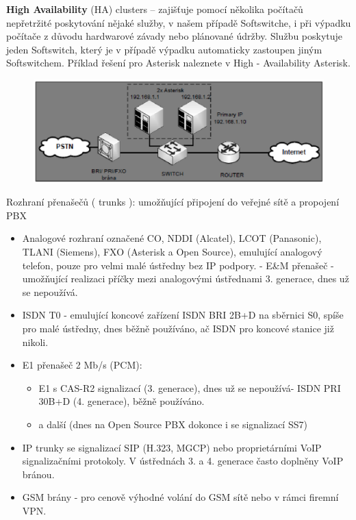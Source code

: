 \textbf{High Availability} (HA) clusters -- zajišťuje pomocí několika počítačů nepřetržité poskytování nějaké služby, v našem případě Softswitche, i při výpadku počítače z důvodu hardwarové závady nebo plánované údržby. Službu poskytuje jeden Softswitch, který je v případě výpadku automaticky zastoupen jiným Softswitchem. Příklad řešení pro Asterisk naleznete v High - Availability Asterisk.

\begin{figure}[h!]
    \begin{center}
        \includegraphics[width=\textwidth]{images/otazka11.png}
        \label{img:5}
    \end{center}
\end{figure}

Rozhraní přenašečů ( trunks ):
umožňující připojení do veřejné sítě a propojení PBX
\begin{itemize}[noitemsep]
    \item Analogové rozhraní označené CO, NDDI (Alcatel), LCOT (Panasonic), TLANI (Siemens), FXO (Asterisk a Open Source), emulující analogový telefon, pouze pro velmi malé ústředny bez IP podpory. - E\&M přenašeč - umožňující realizaci příčky mezi analogovými ústřednami 3. generace, dnes už se nepoužívá.
    \item ISDN T0 - emulující koncové zařízení ISDN BRI 2B+D na sběrnici S0, spíše pro malé ústředny, dnes běžně používáno, ač ISDN pro koncové stanice již nikoli.
    \item E1 přenašeč 2 Mb/s (PCM):
    \begin{itemize}[noitemsep]
        \item E1 s CAS-R2 signalizací (3. generace), dnes už se nepoužívá- ISDN PRI 30B+D (4. generace), běžně používáno.
        \item a další (dnes na Open Source PBX dokonce i se signalizací SS7)
    \end{itemize}
    \item IP trunky se signalizací SIP (H.323, MGCP) nebo proprietárními VoIP signalizačními protokoly. V ústřednách 3. a 4. generace často doplněny VoIP bránou.
    \item GSM brány - pro cenově výhodné volání do GSM sítě nebo v rámci firemní VPN.
\end{itemize}

